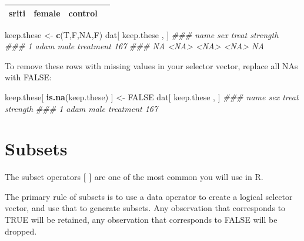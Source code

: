 \documentclass[]{book}
\newenvironment{Shaded}{\begin{snugshade}}{\end{snugshade}}
\newcommand{\CommentTok}[1]{\textcolor[rgb]{0.56,0.35,0.01}{\textit{#1}}}
\newcommand{\KeywordTok}[1]{\textcolor[rgb]{0.13,0.29,0.53}{\textbf{#1}}}
\newcommand{\NormalTok}[1]{#1}
\newcommand{\OtherTok}[1]{\textcolor[rgb]{0.56,0.35,0.01}{#1}}
\newcommand{\StringTok}[1]{\textcolor[rgb]{0.31,0.60,0.02}{#1}}
\theoremstyle{definition}
\theoremstyle{definition}
\theoremstyle{definition}
\theoremstyle{remark}
\begin{document}
\begin{longtable}[]{@{}cccc@{}}
\begin{minipage}[t]{0.10\columnwidth}\centering
sriti\strut
\end{minipage} & \begin{minipage}[t]{0.11\columnwidth}\centering
female\strut
\end{minipage} & \begin{minipage}[t]{0.15\columnwidth}\centering
control\strut
\end{minipage} & \begin{minipage}[t]{0.15\columnwidth}\centering
142\strut
\end{minipage}\tabularnewline
\bottomrule
\end{longtable}

\begin{Shaded}
\begin{Highlighting}[]
\NormalTok{keep.these <-}\StringTok{ }\KeywordTok{c}\NormalTok{(T,F,}\OtherTok{NA}\NormalTok{,F)}
\NormalTok{dat[ keep.these , ]}
\CommentTok{###    name  sex     treat strength}
\CommentTok{### 1  adam male treatment      167}
\CommentTok{### NA <NA> <NA>      <NA>       NA}
\end{Highlighting}
\end{Shaded}

To remove these rows with missing values in your selector vector,
replace all NAs with FALSE:

\begin{Shaded}
\begin{Highlighting}[]
\NormalTok{keep.these[ }\KeywordTok{is.na}\NormalTok{(keep.these) ] <-}\StringTok{ }\OtherTok{FALSE}
\NormalTok{dat[ keep.these , ]}
\CommentTok{###   name  sex     treat strength}
\CommentTok{### 1 adam male treatment      167}
\end{Highlighting}
\end{Shaded}

\hypertarget{subsets}{%
\section{Subsets}\label{subsets}}

The subset operators \textbf{{[} {]}} are one of the most common you
will use in R.

The primary rule of subsets is to use a data operator to create a
logical selector vector, and use that to generate subsets. Any
observation that corresponds to TRUE will be retained, any observation
that corresponds to FALSE will be dropped.
\end{document}
